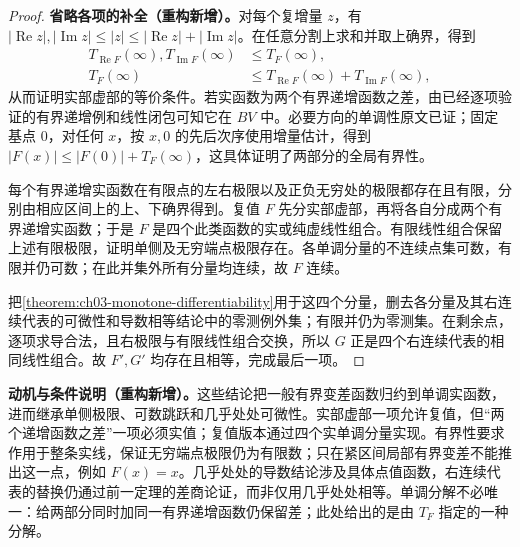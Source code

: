 \documentclass[../../main.tex]{subfiles}%
\begin{document}
\begin{proof}
\textbf{省略各项的补全（重构新增）。}对每个复增量 $z$，有 $|\operatorname{Re}z|,|\operatorname{Im}z|\le|z|\le|\operatorname{Re}z|+|\operatorname{Im}z|$。在任意分割上求和并取上确界，得到
\begin{align*}
T_{\operatorname{Re}F}(\infty),T_{\operatorname{Im}F}(\infty)&\le T_F(\infty),\\
T_F(\infty)&\le T_{\operatorname{Re}F}(\infty)+T_{\operatorname{Im}F}(\infty),
\end{align*}
从而证明实部虚部的等价条件。若实函数为两个有界递增函数之差，由已经逐项验证的有界递增例和线性闭包可知它在 $BV$ 中。必要方向的单调性原文已证；固定基点 $0$，对任何 $x$，按 $x,0$ 的先后次序使用增量估计，得到 $|F(x)|\le|F(0)|+T_F(\infty)$，这具体证明了两部分的全局有界性。

每个有界递增实函数在有限点的左右极限以及正负无穷处的极限都存在且有限，分别由相应区间上的上、下确界得到。复值 $F$ 先分实部虚部，再将各自分成两个有界递增实函数；于是 $F$ 是四个此类函数的实或纯虚线性组合。有限线性组合保留上述有限极限，证明单侧及无穷端点极限存在。各单调分量的不连续点集可数，有限并仍可数；在此并集外所有分量均连续，故 $F$ 连续。

把\cref{theorem:ch03-monotone-differentiability}用于这四个分量，删去各分量及其右连续代表的可微性和导数相等结论中的零测例外集；有限并仍为零测集。在剩余点，逐项求导合法，且右极限与有限线性组合交换，所以 $G$ 正是四个右连续代表的相同线性组合。故 $F',G'$ 均存在且相等，完成最后一项。
\end{proof}
\begin{remark}
\textbf{动机与条件说明（重构新增）。}这些结论把一般有界变差函数归约到单调实函数，进而继承单侧极限、可数跳跃和几乎处处可微性。实部虚部一项允许复值，但“两个递增函数之差”一项必须实值；复值版本通过四个实单调分量实现。有界性要求作用于整条实线，保证无穷端点极限仍为有限数；只在紧区间局部有界变差不能推出这一点，例如 $F(x)=x$。几乎处处的导数结论涉及具体点值函数，右连续代表的替换仍通过前一定理的差商论证，而非仅用几乎处处相等。单调分解不必唯一：给两部分同时加同一有界递增函数仍保留差；此处给出的是由 $T_F$ 指定的一种分解。
\end{remark}
\end{document}
